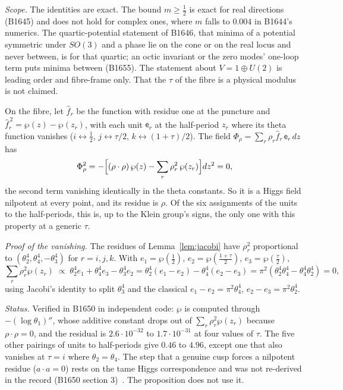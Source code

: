 \noindent\emph{Scope.} The identities are exact. The bound $m\ge\tfrac12$ is exact for real directions (B1645) and does
not hold for complex ones, where $m$ falls to $0.004$ in B1644's numerics. The quartic-potential statement of B1646, that
minima of a potential symmetric under $SO(3)$ and a phase lie on the cone or on the real locus and never between, is for
that quartic; an octic invariant or the zero modes' one-loop term puts minima between (B1655). The statement about
$V=1\oplus U(2)$ is leading order and fibre-frame only. That the $\tau$ of the fibre is a physical modulus is not claimed.

\begin{proposition}\label{prop:o6}
On the fibre, let $\hat f_r$ be the function with residue one at the puncture and $\hat f_r^{\,2}=\wp(z)-\wp(z_r)$, with each
unit $\mathsf e_r$ at the half-period $z_r$ where its theta function vanishes ($i\leftrightarrow\tfrac12$,
$j\leftrightarrow\tau/2$, $k\leftrightarrow(1+\tau)/2$). The field $\Phi_\rho=\sum_r\rho_r\hat f_r\,\mathsf e_r\,dz$ has
\[
  \Phi_\rho^2=-\Bigl[(\rho\cdot\rho)\,\wp(z)-\sum_r\rho_r^2\,\wp(z_r)\Bigr]dz^2=0,
\]
the second term vanishing identically in the theta constants. So it is a Higgs field nilpotent at every point, and its
residue is $\rho$. Of the six assignments of the units to the half-periods, this is, up to the Klein group's signs,
the only one with this property at a generic $\tau$.
\end{proposition}
\noindent\emph{Proof of the vanishing.} The residues of Lemma~\ref{lem:jacobi} have $\rho_r^2$ proportional to
$(\theta_2^4,\theta_4^4,-\theta_3^4)$ for $r=i,j,k$. With $e_1=\wp(\tfrac12)$, $e_2=\wp(\tfrac{1+\tau}{2})$, $e_3=\wp(\tfrac\tau2)$,
\[
  \textstyle\sum_r\rho_r^2\wp(z_r)\;\propto\;\theta_2^4e_1+\theta_4^4e_3-\theta_3^4e_2
  =\theta_2^4(e_1-e_2)-\theta_4^4(e_2-e_3)=\pi^2(\theta_2^4\theta_4^4-\theta_4^4\theta_2^4)=0,
\]
using Jacobi's identity to split $\theta_3^4$ and the classical $e_1-e_2=\pi^2\theta_4^4$, $e_2-e_3=\pi^2\theta_2^4$.

\noindent\emph{Status.} Verified in B1650 in independent code: $\wp$ is computed through $-(\log\theta_1)''$, whose additive constant
drops out of $\sum_r\rho_r^2\wp(z_r)$ because $\rho\cdot\rho=0$, and the residual is $2.6\cdot10^{-32}$ to $1.7\cdot10^{-31}$ at four values of $\tau$. The five other pairings of units to
half-periods give $0.46$ to $4.96$, except one that also vanishes at $\tau=i$ where $\theta_2=\theta_4$. The
step that a genuine cusp forces a nilpotent residue ($a\cdot a=0$) rests on the tame Higgs correspondence and was not
re-derived in the record (B1650 section 3)~\cite{Simpson1990}. The proposition does not use it.


